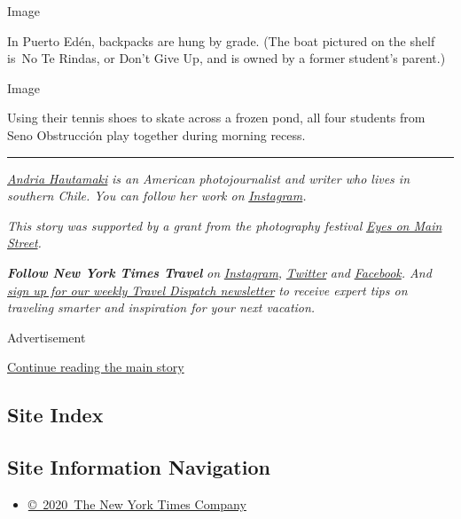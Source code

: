 Image

In Puerto Edén, backpacks are hung by grade. (The boat pictured on the
shelf is~No Te Rindas, or Don't Give Up, and is owned by a former
student's parent.)

Image

Using their tennis shoes to skate across a frozen pond, all four
students from Seno Obstrucción play together during morning recess.

\begin{center}\rule{0.5\linewidth}{\linethickness}\end{center}

\href{https://www.ahowdyphoto.com/}{\emph{Andria Hautamaki}} \emph{is an
American photojournalist and writer who lives in southern Chile. You can
follow her work on}
\href{https://www.instagram.com/ahowdyphoto/}{\emph{Instagram}}\emph{.}

\emph{This story was supported by a grant from the photography festival}
\href{https://www.eyesonmainstreetwilson.com/}{\emph{Eyes on Main
Street}}\emph{.}

\emph{\textbf{Follow New York Times Travel}} \emph{on}
\href{https://www.instagram.com/nytimestravel/}{\emph{Instagram}}\emph{,}
\href{https://twitter.com/nytimestravel}{\emph{Twitter}} \emph{and}
\href{https://www.facebookcorewwwi.onion/nytimestravel/}{\emph{Facebook}}\emph{.
And}
\href{https://www.nytimes3xbfgragh.onion/newsletters/traveldispatch}{\emph{sign
up for our weekly Travel Dispatch newsletter}} \emph{to receive expert
tips on traveling smarter and inspiration for your next vacation.}

Advertisement

\protect\hyperlink{after-bottom}{Continue reading the main story}

\hypertarget{site-index}{%
\subsection{Site Index}\label{site-index}}

\hypertarget{site-information-navigation}{%
\subsection{Site Information
Navigation}\label{site-information-navigation}}

\begin{itemize}
\tightlist
\item
  \href{https://help.nytimes3xbfgragh.onion/hc/en-us/articles/115014792127-Copyright-notice}{©~2020~The
  New York Times Company}
\end{itemize}

